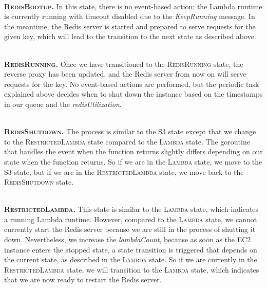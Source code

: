 
~\\
\textbf{\textsc{RedisBootup.}} In this state, there is no event-based action; the Lambda runtime is currently running with timeout disabled due to the \emph{KeepRunning} message. In the meantime, the Redis server is started and prepared to serve requests for the given key, which will lead to the transition to the next state as described above.

~\\
\textbf{\textsc{RedisRunning.}} Once we have transitioned to the \textsc{RedisRunning} state, the reverse proxy has been updated, and the Redis server from now on will serve requests for the key. No event-based actions are performed, but the periodic task explained above decides when to shut down the instance based on the timestamps in our queue and the \emph{redisUtilization}.

~\\
\textbf{\textsc{RedisShutdown.}} The process is similar to the \textsc{S3} state except that we change to the \textsc{RestrictedLambda} state compared to the \textsc{Lambda} state. The goroutine that handles the event when the function returns slightly differs depending on our state when the function returns. So if we are in the \textsc{Lambda} state, we move to the \textsc{S3} state, but if we are in the \textsc{RestrictedLambda} state, we move back to the \textsc{RedisShutdown} state.

~\\
\textbf{\textsc{RestrictedLambda.}} This state is similar to the \textsc{Lambda} state, which indicates a running Lambda runtime. However, compared to the \textsc{Lambda} state, we cannot currently start the Redis server because we are still in the process of shutting it down. Nevertheless, we increase the \emph{lambdaCount}, because as soon as the EC2 instance enters the stopped state, a state transition is triggered that depends on the current state, as described in the \textsc{Lambda} state. So if we are currently in the \textsc{RestrictedLambda} state, we will transition to the \textsc{Lambda} state, which indicates that we are now ready to restart the Redis server.

